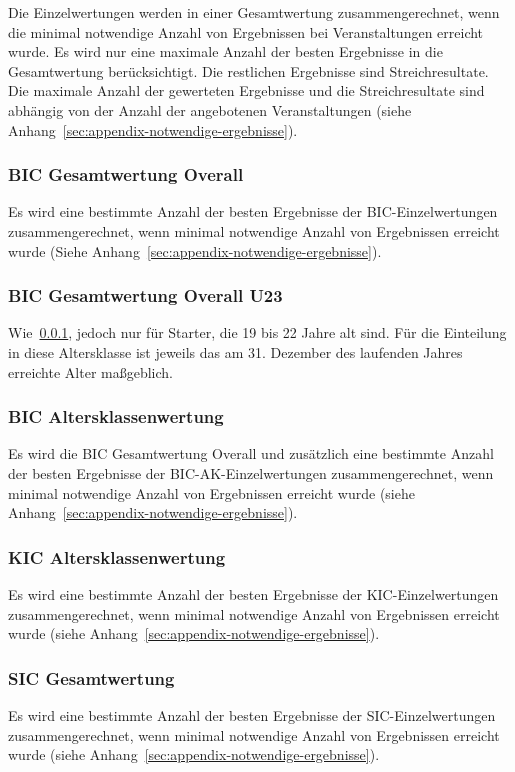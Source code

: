 Die Einzelwertungen werden in einer Gesamtwertung zusammengerechnet, wenn die minimal notwendige Anzahl von Ergebnissen bei Veranstaltungen erreicht wurde. Es wird nur eine maximale Anzahl der besten Ergebnisse in die Gesamtwertung berücksichtigt. Die restlichen Ergebnisse sind Streichresultate. Die maximale Anzahl der gewerteten Ergebnisse und die Streichresultate sind abhängig von der Anzahl der angebotenen Veranstaltungen (siehe Anhang~\ref{sec:appendix-notwendige-ergebnisse}).

\subsubsection{BIC Gesamtwertung Overall}
\label{subsec:bic-gesamtwertung-overall}
Es wird eine bestimmte Anzahl der besten Ergebnisse der BIC-Einzelwertungen zusammengerechnet, wenn minimal notwendige Anzahl von Ergebnissen erreicht wurde (Siehe Anhang~\ref{sec:appendix-notwendige-ergebnisse}).

\subsubsection{BIC Gesamtwertung Overall U23}
\label{subsec:bic-gesamtwertung-u23}
Wie~\ref{subsec:bic-gesamtwertung-overall}, jedoch nur für Starter, die 19 bis 22 Jahre alt sind. Für die Einteilung in diese Altersklasse ist jeweils das am 31. Dezember des laufenden Jahres erreichte Alter maßgeblich.

\subsubsection{BIC Altersklassenwertung}
\label{subsec:bic-ak-gesamtwertung}
Es wird die BIC Gesamtwertung Overall und zusätzlich eine bestimmte Anzahl der besten Ergebnisse der BIC-AK-Einzelwertungen zusammengerechnet, wenn minimal notwendige Anzahl von Ergebnissen erreicht wurde (siehe Anhang~\ref{sec:appendix-notwendige-ergebnisse}).

\subsubsection{KIC Altersklassenwertung}
\label{subsec:kic-gesamtwertung}
Es wird eine bestimmte Anzahl der besten Ergebnisse der KIC-Einzelwertungen zusammengerechnet, wenn minimal notwendige Anzahl von Ergebnissen erreicht wurde (siehe Anhang~\ref{sec:appendix-notwendige-ergebnisse}).

\subsubsection{SIC Gesamtwertung}
\label{subsec:sic-gesamtwertung}
Es wird eine bestimmte Anzahl der besten Ergebnisse der SIC-Einzelwertungen zusammengerechnet, wenn minimal notwendige Anzahl von Ergebnissen erreicht wurde (siehe Anhang~\ref{sec:appendix-notwendige-ergebnisse}).

